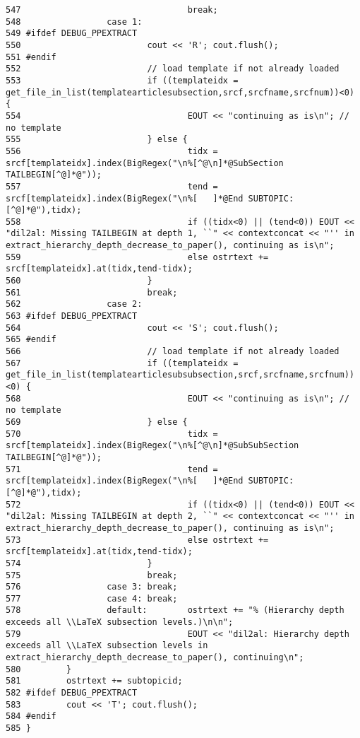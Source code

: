 \begin{verbatim}
547                                 break;
548                 case 1: 
549 #ifdef DEBUG_PPEXTRACT
550                         cout << 'R'; cout.flush();
551 #endif
552                         // load template if not already loaded
553                         if ((templateidx = get_file_in_list(templatearticlesubsection,srcf,srcfname,srcfnum))<0) {
554                                 EOUT << "continuing as is\n"; // no template
555                         } else {
556                                 tidx = srcf[templateidx].index(BigRegex("\n%[^@\n]*@SubSection TAILBEGIN[^@]*@"));
557                                 tend = srcf[templateidx].index(BigRegex("\n%[   ]*@End SUBTOPIC:[^@]*@"),tidx);
558                                 if ((tidx<0) || (tend<0)) EOUT << "dil2al: Missing TAILBEGIN at depth 1, ``" << contextconcat << "'' in extract_hierarchy_depth_decrease_to_paper(), continuing as is\n";
559                                 else ostrtext += srcf[templateidx].at(tidx,tend-tidx);
560                         }
561                         break;
562                 case 2:
563 #ifdef DEBUG_PPEXTRACT
564                         cout << 'S'; cout.flush();
565 #endif
566                         // load template if not already loaded
567                         if ((templateidx = get_file_in_list(templatearticlesubsubsection,srcf,srcfname,srcfnum))<0) {
568                                 EOUT << "continuing as is\n"; // no template
569                         } else {
570                                 tidx = srcf[templateidx].index(BigRegex("\n%[^@\n]*@SubSubSection TAILBEGIN[^@]*@"));
571                                 tend = srcf[templateidx].index(BigRegex("\n%[   ]*@End SUBTOPIC:[^@]*@"),tidx);
572                                 if ((tidx<0) || (tend<0)) EOUT << "dil2al: Missing TAILBEGIN at depth 2, ``" << contextconcat << "'' in extract_hierarchy_depth_decrease_to_paper(), continuing as is\n";
573                                 else ostrtext += srcf[templateidx].at(tidx,tend-tidx);
574                         }
575                         break;
576                 case 3: break;
577                 case 4: break;
578                 default:        ostrtext += "% (Hierarchy depth exceeds all \\LaTeX subsection levels.)\n\n";
579                                 EOUT << "dil2al: Hierarchy depth exceeds all \\LaTeX subsection levels in extract_hierarchy_depth_decrease_to_paper(), continuing\n";
580         }
581         ostrtext += subtopicid;
582 #ifdef DEBUG_PPEXTRACT
583         cout << 'T'; cout.flush();
584 #endif
585 }
\end{verbatim}\normalsize 
{}
